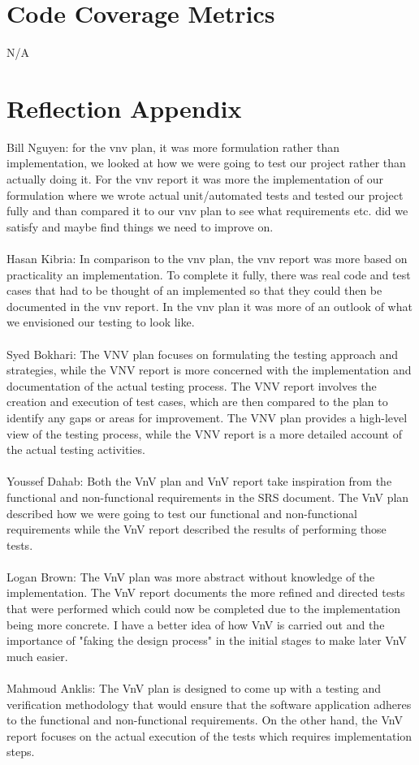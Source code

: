 \documentclass[12pt, titlepage]{article}
\begin{document}
\section{Code Coverage Metrics}
N/A
\section{Reflection Appendix}
Bill Nguyen: for the vnv plan, it was more formulation rather than implementation, we looked at how we were going to test our project rather than actually doing it. For the vnv report it was more the implementation of our formulation where we wrote actual unit/automated tests and tested our project fully and than compared it to our vnv plan to see what requirements etc. did we satisfy and maybe find things we need to improve on.\\\\
Hasan Kibria: In comparison to the vnv plan, the vnv report was more based on practicality an implementation. To complete it fully, there was real code and test cases that had to be thought of an implemented so that they could then be documented in the vnv report. In the vnv plan it was more of an outlook of what we envisioned our testing to look like.\\\\
Syed Bokhari: The VNV plan focuses on formulating the testing approach and strategies, while the VNV report is more concerned with the implementation and documentation of the actual testing process. The VNV report involves the creation and execution of test cases, which are then compared to the plan to identify any gaps or areas for improvement. The VNV plan provides a high-level view of the testing process, while the VNV report is a more detailed account of the actual testing activities.\\\\
Youssef Dahab: Both the VnV plan and VnV report take inspiration from the functional and non-functional requirements in the SRS document. The VnV plan described how we were going to test our functional and non-functional requirements while the VnV report described the results of performing those tests.\\\\
Logan Brown: The VnV plan was more abstract without knowledge of the implementation. The VnV report documents the more refined and directed tests that were performed which could now be completed due to the implementation being more concrete. I have a better idea of how VnV is carried out and the importance of "faking the design process" in the initial stages to make later VnV much easier.\\\\
Mahmoud Anklis: The VnV plan is designed to come up with a testing and verification methodology that would ensure that the software application adheres to the functional and non-functional requirements. On the other hand, the VnV report focuses on the actual execution of the tests which requires implementation steps.\\\\




\end{document}
